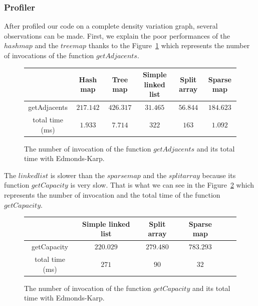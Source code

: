 \subsubsection{Profiler}
After profiled our code on a complete density variation graph, several observations can be made. First, we explain the poor performances of the $hashmap$ and the $treemap$ thanks to the Figure~\ref{fig:ekadja} which represents the number of invocations of the function $getAdjacents$.
\begin{figure}[h]
\centering
\begin{tabular}{|c|c|c|c|c|c|}
	\hline
     & \textbf{Hash map} & \textbf{Tree map} & \textbf{Simple linked list} & \textbf{Split array} & \textbf{Sparse map}\\
     \hline	
   getAdjacents & $217.142$ & $426.317$ & $31.465$ & $56.844$ & $184.623$ \\
   total time (ms) & $1.933$ & $7.714$ & $322$ & $163$ & $1.092$ \\
   \hline
\end{tabular}
\caption{The number of invocation of the function $getAdjacents$ and its total time with Edmonds-Karp.}
\label{fig:ekadja} 
\end{figure}
The $linkedlist$ is slower than the $sparsemap$ and the $splitarray$ because its function $getCapacity$ is very slow. That is what we can see in the Figure~\ref{fig:ekcapa} which represents the number of invocation and the total time of the function $getCapacity$.
\begin{figure}[h]
\centering
\begin{tabular}{|c|c|c|c|c|c|}
	\hline
     & \textbf{Simple linked list} & \textbf{Split array} & \textbf{Sparse map}\\
     \hline	
   getCapacity & $220.029$ & $279.480$ & $783.293$ \\
   total time (ms) & $271$ & $90$ & $32$ \\
   \hline
\end{tabular}
\caption{The number of invocation of the function $getCapacity$ and its total time with Edmonds-Karp.}
\label{fig:ekcapa}
\end{figure}
